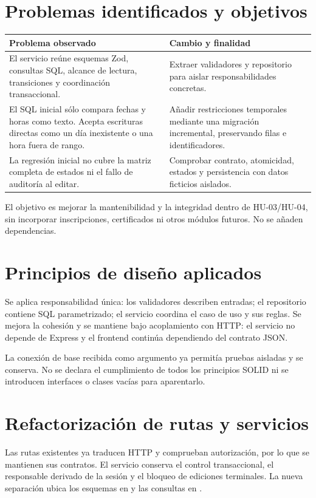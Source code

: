 \section{Problemas identificados y objetivos}
\begin{longtable}{P{0.44\textwidth}P{0.49\textwidth}}
\toprule
Problema observado & Cambio y finalidad \\
\midrule
\endhead
El servicio reúne esquemas Zod, consultas SQL, alcance de lectura, transiciones y coordinación transaccional. & Extraer validadores y repositorio para aislar responsabilidades concretas. \\
El SQL inicial sólo compara fechas y horas como texto. Acepta escrituras directas como un día inexistente o una hora fuera de rango. & Añadir restricciones temporales mediante una migración incremental, preservando filas e identificadores. \\
La regresión inicial no cubre la matriz completa de estados ni el fallo de auditoría al editar. & Comprobar contrato, atomicidad, estados y persistencia con datos ficticios aislados. \\
\bottomrule
\end{longtable}

El objetivo es mejorar la mantenibilidad y la integridad dentro de HU-03/HU-04, sin incorporar inscripciones, certificados ni otros módulos futuros. No se añaden dependencias.

\section{Principios de diseño aplicados}
Se aplica responsabilidad única: los validadores describen entradas; el repositorio contiene SQL parametrizado; el servicio coordina el caso de uso y sus reglas. Se mejora la cohesión y se mantiene bajo acoplamiento con HTTP: el servicio no depende de Express y el frontend continúa dependiendo del contrato JSON.

La conexión de base recibida como argumento ya permitía pruebas aisladas y se conserva. No se declara el cumplimiento de todos los principios SOLID ni se introducen interfaces o clases vacías para aparentarlo.

\section{Refactorización de rutas y servicios}
Las rutas existentes ya traducen HTTP y comprueban autorización, por lo que se mantienen sus contratos. El servicio conserva el control transaccional, el responsable derivado de la sesión y el bloqueo de ediciones terminales. La nueva separación ubica los esquemas en  y las consultas en .

